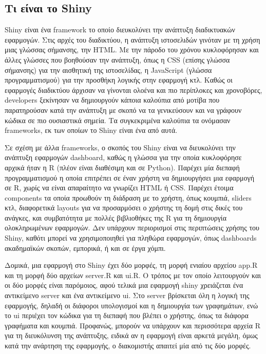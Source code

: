 \documentclass{article}
\begin{document}

\subsection{Τι είναι το Shiny}

 Shiny είναι ένα framework το οποίο διευκολύνει την ανάπτυξη διαδικτυακών εφαρμογών. \cite{chang2024shiny} Στις αρχές του διαδικτύου, η ανάπτυξη ιστοσελιδών γινόταν με τη χρήση μιας γλώσσας σήμανσης, την HTML. Με την πάροδο του χρόνου κυκλοφόρησαν και άλλες γλώσσες που βοηθούσαν την ανάπτυξη, όπως η CSS (επίσης γλώσσα σήμανσης) για την αισθητική της ιστοσελίδας, η JavaScript (γλώσσα προγραμματισμού) για την προσθήκη λογικής στην εφαρμογή κτλ. Καθώς οι εφαρμογές διαδικτύου άρχισαν να γίνονται ολοένα και πιο περίπλοκες και χρονοβόρες, developers ξεκίνησαν να δημιουργούν κάποια καλούπια από μοτίβα που παρατηρούσαν κατά την ανάπτυξη με σκοπό να τα γενικεύσουν και να γράφουν κώδικα σε πιο ουσιαστικά σημεία. Τα συγκεκριμένα καλούπια τα ονόμασαν frameworks, εκ των οποίων το Shiny είναι ένα από αυτά. 

Σε σχέση με άλλα frameworks, ο σκοπός του Shiny είναι να διευκολύνει την ανάπτυξη εφαρμογών dashboard, καθώς η γλώσσα για την οποία κυκλοφόρησε αρχικά ήταν η R (πλέον είναι διαθέσιμη και σε Python). Παρέχει μία διεπαφή προγραμματισμού η οποία επιτρέπει σε έναν χρήστη να δημιουργήσει μια εφαρμογή σε R, χωρίς να είναι απαραίτητο να γνωρίζει HTML ή CSS. Παρέχει έτοιμα components τα οποία προωθούν τη διάδραση με το χρήστη, όπως κουμπιά, sliders κτλ, διαφορετικά layouts για να προσαρμόσει ο χρήστης τη δομή στις δικές του ανάγκες, και συμβατότητα με πολλές βιβλιοθήκες της R για τη δημιουργία ολοκληρωμένων εφαρμογών. Δεν υπάρχουν περιορισμοί στις περιπτώσεις χρήσης του Shiny, καθότι μπορεί να χρησιμοποιηθεί για πληθώρα εφαρμογών, όπως dashboards ακαδημαϊκών σκοπών, εμπορικά, ή και σε έργα χόμπι.

Δομικά, μια εφαρμογή στο Shiny έχει δύο μορφές, τη μορφή ενιαίου αρχείου app.R και τη μορφή δύο αρχείων server.R και ui.R. Ο τρόπος με τον οποίο λειτουργούν και οι δύο μορφές είναι παρόμοιος, αφού τελικά μια εφαρμογή shiny χρειάζεται ένα αντικείμενο server και ένα αντικείμενο ui. Στο server βρίσκεται όλη η λογική της εφαρμογής, δηλαδή οι διάφοροι υπολογισμοί και η δημιουργία των γραφημάτων, ενώ το ui περιέχει τον κώδικα για τη διεπαφή που βλέπει ο χρήστης, όπως τα διάφορα γραφήματα και κουμπιά. Προφανώς, μπορούν να υπάρχουν και περισσότερα αρχεία R για τη διευκόλυνση της ανάπτυξης, ειδικά αν η εφαρμογή είναι αρκετά μεγάλη, όμως κατά την ανάρτηση της εφαρμογής, ο διακομιστής απαιτεί μία από τις δύο μορφές. 
\end{document}
